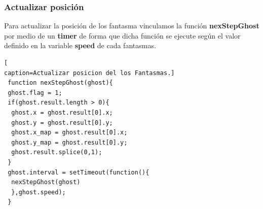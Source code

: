 \subsubsection*{Actualizar posición}
Para actualizar la posición de los fantasma vinculamos la función \textbf{nexStepGhost} por medio de un \textbf{timer} de forma que dicha función se ejecute según el valor definido en la variable \textbf{speed} de cada fantasmas.
\begin{lstlisting}[
caption=Actualizar posicion del los Fantasmas.]
 function nexStepGhost(ghost){
 ghost.flag = 1;
 if(ghost.result.length > 0){
  ghost.x = ghost.result[0].x;
  ghost.y = ghost.result[0].y;
  ghost.x_map = ghost.result[0].x;
  ghost.y_map = ghost.result[0].y;
  ghost.result.splice(0,1);
 }
 ghost.interval = setTimeout(function(){
  nexStepGhost(ghost)
  },ghost.speed);
 }
\end{lstlisting}
